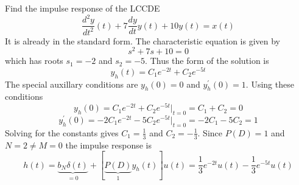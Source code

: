 \begin{example}
Find the impulse response of the LCCDE
\[
\frac{d^2y}{dt^2}(t) + 7\frac{dy}{dt}y(t) + 10y(t) = x(t) 
\]
It is already in the standard form. The characteristic equation is given by
\[
s^2 + 7s + 10 = 0
\]
which has roots $s_1 = -2$ and $s_2 = -5$. Thus the form of the solution is
\[
y_h(t) = C_1e^{-2t} + C_2e^{-5t}
\]
The special auxillary conditions are $y_h(0) = 0$ and $y^\prime_h(0) = 1$. Using these conditions
\[
y_h(0) = C_1e^{-2t} + C_2e^{-5t} |_{t = 0} = C_1 + C_2 = 0
\]
\[
y^\prime_h(0) = -2C_1e^{-2t} - 5C_2e^{-5t} |_{t = 0} = -2C_1 -5C_2 = 1
\]
Solving for the constants gives $C_1 = \frac{1}{3}$ and $C_2 = -\frac{1}{3}$. Since $P(D) = 1$ and $N = 2 \neq M = 0$ the impulse response is
\[
h(t) = \underbrace{b_N\delta(t)}_{=0} + \left[ \underbrace{P(D)}_{1}y_h(t)\right]u(t) = \frac{1}{3} e^{-2t}u(t) - \frac{1}{3} e^{-5t}u(t)
\]
\end{example}
